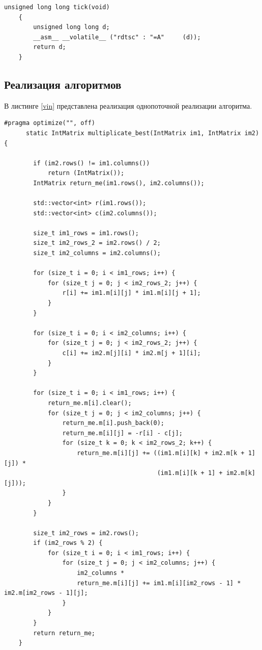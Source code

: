 \documentclass[a4paper, 14pt]{article}
\begin{document}
	\begin{lstlisting}[label=time,caption=Функция замера процессороного времени]
    unsigned long long tick(void)
    {
        unsigned long long d;
        __asm__ __volatile__ ("rdtsc" : "=A"     (d));
        return d;
    }
	\end{lstlisting}

	\newpage
	\subsection{Реализация алгоритмов}
	
	В листинге \ref{vin} представлена реализация однопоточной реализации алгоритма.
	
	\begin{lstlisting}[label=vin,caption=Алгоритм Виноградова с оптимизациями]
  #pragma optimize("", off)
      static IntMatrix multiplicate_best(IntMatrix im1, IntMatrix im2) {

        if (im2.rows() != im1.columns())
            return (IntMatrix());
        IntMatrix return_me(im1.rows(), im2.columns());

        std::vector<int> r(im1.rows());
        std::vector<int> c(im2.columns());

        size_t im1_rows = im1.rows();
        size_t im2_rows_2 = im2.rows() / 2; 
        size_t im2_columns = im2.columns();

        for (size_t i = 0; i < im1_rows; i++) { 
            for (size_t j = 0; j < im2_rows_2; j++) { 
                r[i] += im1.m[i][j] * im1.m[i][j + 1]; 
            }
        }

        for (size_t i = 0; i < im2_columns; i++) {
            for (size_t j = 0; j < im2_rows_2; j++) { 
                c[i] += im2.m[j][i] * im2.m[j + 1][i];
            }
        }

        for (size_t i = 0; i < im1_rows; i++) { 
            return_me.m[i].clear(); 
            for (size_t j = 0; j < im2_columns; j++) { 
                return_me.m[i].push_back(0);
                return_me.m[i][j] = -r[i] - c[j];
                for (size_t k = 0; k < im2_rows_2; k++) {
                    return_me.m[i][j] += ((im1.m[i][k] + im2.m[k + 1][j]) *
                                          (im1.m[i][k + 1] + im2.m[k][j]));
                }
            }
        }

        size_t im2_rows = im2.rows();
        if (im2_rows % 2) { 
            for (size_t i = 0; i < im1_rows; i++) { 
                for (size_t j = 0; j < im2_columns; j++) {
                    im2_columns *
                    return_me.m[i][j] += im1.m[i][im2_rows - 1] * im2.m[im2_rows - 1][j];
                }
            }
        } 
        return return_me;
    }
	\end{lstlisting}
	
\end{document}
